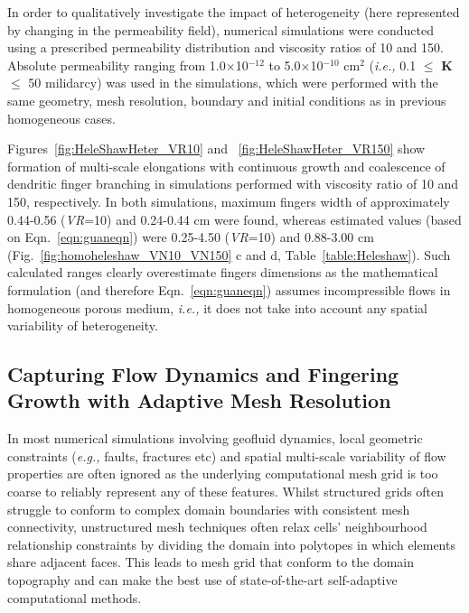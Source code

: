 \documentclass[preprint,authoryear,12pt]{elsarticle}
\newcommand{\eg}{{\it e.g., }}
\newcommand{\ie}{{\it i.e., }}
\begin{document}
\medskip
In order to qualitatively investigate the impact of heterogeneity (here represented by changing in the permeability field), numerical simulations were conducted using a prescribed permeability distribution and viscosity ratios of 10 and 150. Absolute permeability ranging from 1.0$\times$10$^{-12}$ to 5.0$\times$10$^{-10}$ cm$^{2}$ (\ie 0.1 $\le$ {\bf K} $\le$ 50 milidarcy) was used in the simulations, which were performed with the same geometry,  mesh resolution, boundary and initial conditions as in previous homogeneous cases. 

\medskip
Figures~\ref{fig:HeleShawHeter_VR10} and ~\ref{fig:HeleShawHeter_VR150} show formation of multi-scale elongations with continuous growth and coalescence of dendritic finger branching in simulations performed with viscosity ratio of 10 and 150, respectively. In both simulations, maximum fingers width of approximately 0.44-0.56 ({\it VR}=10) and 0.24-0.44 cm were found, whereas estimated values (based on Eqn.~\ref{eqn:guaneqn}) were 0.25-4.50 ({\it VR}=10) and 0.88-3.00 cm (Fig.~\ref{fig:homoheleshaw_VN10_VN150} c and d, Table~\ref{table:Heleshaw}). Such calculated ranges \citep[\ie theoretical values based on analytic solutions due to][]{mclean_1981} clearly overestimate fingers dimensions as the mathematical formulation (and therefore Eqn.~\ref{eqn:guaneqn}) assumes incompressible flows in homogeneous porous medium, \ie it does not take into account any spatial variability of heterogeneity.       
     
\subsection{Capturing Flow Dynamics and Fingering Growth with Adaptive Mesh Resolution}\label{section:results_hete_fix_adapt}    
In most numerical simulations involving geofluid dynamics, local geometric constraints (\eg faults, fractures etc) and spatial multi-scale variability of flow properties are often ignored as the underlying computational mesh grid is too coarse to reliably represent any of these features. Whilst structured grids often struggle to conform to complex domain boundaries with consistent mesh connectivity, unstructured mesh techniques often relax cells' neighbourhood relationship constraints by dividing the domain into polytopes in which elements share adjacent faces. This leads to mesh grid that conform to the domain topography and can make the best use of state-of-the-art self-adaptive computational methods.
\end{document}

